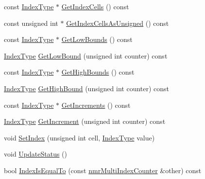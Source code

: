 \begin{DoxyCompactItemize}
const \hyperlink{classnmr_multi_index_counter_a0632b941a7d18df347174b4345d73d01}{Index\-Type} $\ast$ \hyperlink{classnmr_multi_index_counter_a019838a51b11082ab44a96e2cff6cc87}{Get\-Index\-Cells} () const 
\item 
const unsigned int $\ast$ \hyperlink{classnmr_multi_index_counter_ace36b5b9a81d09e71cb3328e7077803d}{Get\-Index\-Cells\-As\-Unsigned} () const 
\item 
const \hyperlink{classnmr_multi_index_counter_a0632b941a7d18df347174b4345d73d01}{Index\-Type} $\ast$ \hyperlink{classnmr_multi_index_counter_a3d40fe291e5a16c3aedc034914e3ab96}{Get\-Low\-Bounds} () const 
\item 
\hyperlink{classnmr_multi_index_counter_a0632b941a7d18df347174b4345d73d01}{Index\-Type} \hyperlink{classnmr_multi_index_counter_aae80c4130fd2a3c4272b4aad69f97a6c}{Get\-Low\-Bound} (unsigned int counter) const 
\item 
const \hyperlink{classnmr_multi_index_counter_a0632b941a7d18df347174b4345d73d01}{Index\-Type} $\ast$ \hyperlink{classnmr_multi_index_counter_a3ba9efd862ef333a3c6875e60a0b7098}{Get\-High\-Bounds} () const 
\item 
\hyperlink{classnmr_multi_index_counter_a0632b941a7d18df347174b4345d73d01}{Index\-Type} \hyperlink{classnmr_multi_index_counter_a569847ae686881f21f6e9e78888df3a2}{Get\-High\-Bound} (unsigned int counter) const 
\item 
const \hyperlink{classnmr_multi_index_counter_a0632b941a7d18df347174b4345d73d01}{Index\-Type} $\ast$ \hyperlink{classnmr_multi_index_counter_a18395a3904f27dd5cf71c031987bd3d6}{Get\-Increments} () const 
\item 
\hyperlink{classnmr_multi_index_counter_a0632b941a7d18df347174b4345d73d01}{Index\-Type} \hyperlink{classnmr_multi_index_counter_a940af4b0bf874b49ee3b88ccc8197dbe}{Get\-Increment} (unsigned int counter) const 
\item 
void \hyperlink{classnmr_multi_index_counter_a61e0301bf7b5ec02534740217c1ed1e6}{Set\-Index} (unsigned int cell, \hyperlink{classnmr_multi_index_counter_a0632b941a7d18df347174b4345d73d01}{Index\-Type} value)
\item 
void \hyperlink{classnmr_multi_index_counter_ac8b6bc2c60b5446aaaf20bd569fb5e61}{Update\-Status} ()
\item 
bool \hyperlink{classnmr_multi_index_counter_a3700909e665bce2008d94272172d7f4a}{Index\-Is\-Equal\-To} (const \hyperlink{classnmr_multi_index_counter}{nmr\-Multi\-Index\-Counter} \&other) const 
\item 

\end{DoxyCompactItemize}
